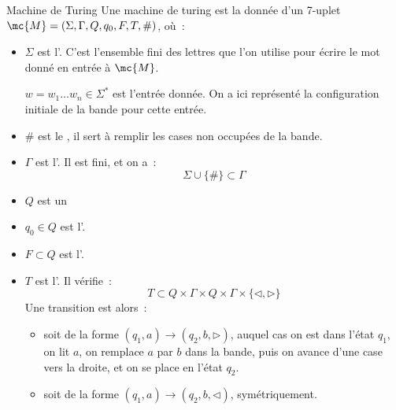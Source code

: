 \begin{definition}{}{Machine de Turing}
    Une machine de turing est la donnée d'un 7-uplet $\mc{M} = (\Sigma, \Gamma, Q, q_0, F, T, \#)$, où~:
    \begin{itemize}
        \item $\Sigma$ est l'. C'est l'ensemble fini des lettres que l'on utilise pour écrire le mot donné en entrée à $\mc{M}$.
        \begin{center}
        \end{center}
        $w = w_1 \dots w_n \in \Sigma^*$ est l'entrée donnée. On a ici représenté la configuration initiale de la bande pour cette entrée.
        \item $\#$ est le , il sert à remplir les cases non occupées de la bande.
        \item $\Gamma$ est l'. Il est fini, et on a~:
        $$\Sigma \cup \{\#\} \subset \Gamma$$
        \item $Q$ est un 
        \item $q_0 \in Q$ est l'.
        \item $F \subset Q$ est l'.
        \item $T$ est l'. Il vérifie~:
        $$T \subset Q \times \Gamma \times Q \times \Gamma \times \{\triangleleft, \triangleright \}$$
        Une transition est alors~:
        \begin{itemize}
            \item soit de la forme $(q_1, a) \rightarrow (q_2, b, \triangleright)$, auquel cas on est dans l'état $q_1$, on lit $a$, on remplace $a$ par $b$ dans la bande, puis on avance d'une case vers la droite, et on se place en l'état $q_2$.
            \item soit de la forme $(q_1, a) \rightarrow (q_2, b, \triangleleft)$, symétriquement.
        \end{itemize}
    \end{itemize}
\end{definition}

